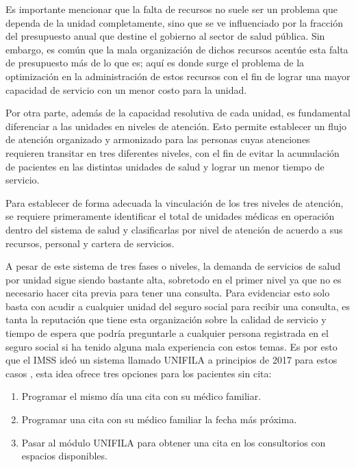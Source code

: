 \documentclass[10pt]{article}
\begin{document}
    Es importante mencionar que la falta de recursos no suele ser un problema que dependa de la unidad completamente, sino que se ve influenciado por la fracción del presupuesto anual que destine el gobierno al sector de salud pública. Sin embargo, es común que la mala organización de dichos recursos acentúe esta falta de presupuesto más de lo que es; aquí es donde surge el problema de la optimización en la administración de estos recursos con el fin de lograr una mayor capacidad de servicio con un menor costo para la unidad.
    
    Por otra parte, además de la capacidad resolutiva de cada unidad, es fundamental diferenciar a las unidades en niveles de atención. Esto permite establecer un flujo de atención organizado y armonizado para las personas cuyas atenciones requieren transitar en tres diferentes niveles, con el fin de evitar la acumulación de pacientes en las distintas unidades de salud y lograr un menor tiempo de servicio.
    
    Para establecer de forma adecuada la vinculación de los tres niveles de atención, se requiere primeramente identificar el total de unidades médicas en operación dentro del sistema de salud y clasificarlas por nivel de atención de acuerdo a sus recursos, personal y cartera de servicios.
    
    A pesar de este sistema de tres fases o niveles, la demanda de servicios de salud por unidad sigue siendo bastante alta, sobretodo en el primer nivel ya que no es necesario hacer cita previa para tener una consulta. Para evidenciar esto solo basta con acudir a cualquier unidad del seguro social para recibir una consulta, es tanta la reputación que tiene esta organización sobre la calidad de servicio y tiempo de espera que podría preguntarle a cualquier persona registrada en el seguro social si ha tenido alguna mala experiencia con estos temas. Es por esto que el IMSS ideó un sistema llamado UNIFILA a principios de 2017 para estos casos \cite{UNIFILA}, esta idea ofrece tres opciones para los pacientes sin cita:
    \begin{enumerate}
    	\item Programar el mismo día una cita con su médico familiar.
    	\item Programar una cita con su médico familiar la fecha más próxima.
    	\item Pasar al módulo UNIFILA para obtener una cita en los consultorios con espacios disponibles.
    \end{enumerate}
    
\end{document}
